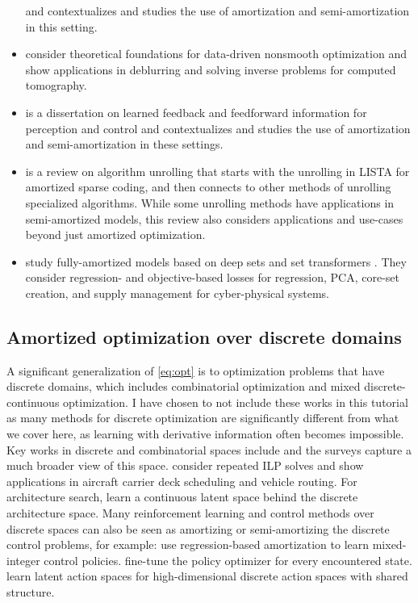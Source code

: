 \documentclass[twoside,11pt]{article}
\begin{document}
\begin{itemize}
  and contextualizes and studies the use of amortization and
  semi-amortization in this setting.
\item \citet{banert2020data} consider theoretical foundations
  for data-driven nonsmooth optimization and show applications
  in deblurring and solving inverse problems for
  computed tomography.
\item \citet{marino2021learned} is a dissertation on learned
  feedback and feedforward information for perception and control
  and contextualizes and studies the use of amortization and
  semi-amortization in these settings.
\item \citet{monga2021algorithm} is a review on
  algorithm unrolling that starts with the unrolling
  in LISTA \citep{gregor2010learning} for amortized
  sparse coding, and then connects to other methods
  of unrolling specialized algorithms.
  While some unrolling methods have applications in
  semi-amortized models, this review also considers
  applications and use-cases beyond just
  amortized optimization.
\item \citet{liu2022teaching} study fully-amortized
  models based on deep sets \citep{zaheer2017deep}
  and set transformers \citep{lee2019set}.
  They consider regression- and objective-based losses
  for regression, PCA, core-set creation, and
  supply management for cyber-physical systems.
\end{itemize}

\subsection{Amortized optimization over discrete domains}
A significant generalization of \cref{eq:opt} is to optimization
problems that have discrete domains,
which includes combinatorial optimization
and mixed discrete-continuous optimization.
I have chosen to not include these works in this tutorial
as many methods for discrete optimization are significantly
different from what we cover here, as learning with
derivative information often becomes impossible.
Key works in discrete and combinatorial spaces include
\citet{khalil2016learning,dai2017learning,jeong2019learning,bertsimas2019online,shao2021learning,bertsimas2021voice,cappart2021combinatorial}
and the surveys
\citep{lodi2017learning,bengio2021machine,kotary2021end}
capture a much broader view of this space.
\citet{banerjee2015efficiently} consider repeated ILP solves
and show applications in aircraft carrier deck scheduling and vehicle routing.
For architecture search, \citet{luo2018neural} learn a continuous
latent space behind the discrete architecture space.
Many reinforcement learning and control methods over discrete
spaces can also be seen as amortizing or semi-amortizing the
discrete control problems, for example:
\citet{cauligi2020learning,cauligi2021coco} use regression-based
amortization to learn mixed-integer control policies.
\citet{fickinger2021scalable} fine-tune the policy
optimizer for every encountered state.
\citet{tennenholtz2019natural,chandak2019learning,van2020q}
learn latent action spaces for high-dimensional
discrete action spaces with shared structure.
\end{document}
